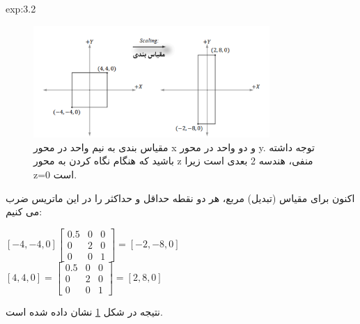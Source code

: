 {\begin{spacing}{1.5}
\begin{example}{exp:3.2}
            \begin{figure}[H]
                \centering
                \setlength{\belowcaptionskip}{-10pt}
                \includegraphics[width=0.8\textwidth]{Images/4/3/4.Session.1.3.2}
                \caption {مقیاس بندی به نیم واحد در محور x و دو واحد در محور y. توجه داشته باشید که هنگام نگاه کردن به محور z منفی، هندسه 2 بعدی است زیرا z=0 است.}
                \label{fig:4.Session.1.3.2}
            \end{figure}

            اکنون برای مقیاس (تبدیل) مربع، هر دو نقطه حداقل و حداکثر را در این ماتریس ضرب می کنیم:

            \begin{center}
                $[-4,-4,0]\begin{bmatrix}
                              0.5 & 0 & 0 \\
                              0   & 2 & 0 \\
                              0   & 0 & 1
                \end{bmatrix}=[-2,-8,0]$\\$[4,4,0]=\begin{bmatrix}
                                                       0.5 & 0 & 0 \\
                                                       0   & 2 & 0 \\
                                                       0   & 0 & 1
                \end{bmatrix}=[2,8,0]$
            \end{center}

            نتیجه در شکل \ref{fig:4.Session.1.3.2} نشان داده شده است.
        \end{example}
    \end{spacing}
}

